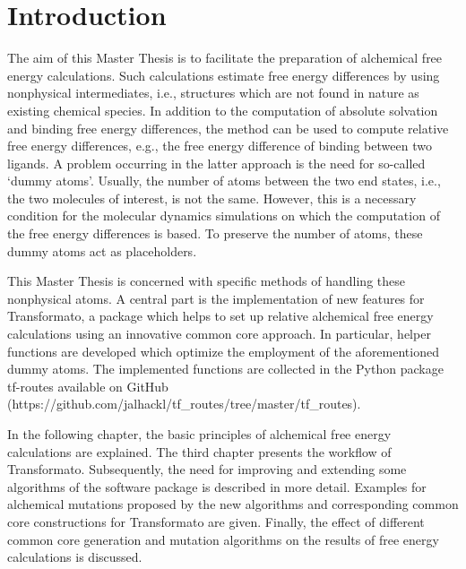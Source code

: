 \chapter{Introduction}

The aim of this Master Thesis is to facilitate the preparation of
alchemical free energy calculations. Such calculations
estimate free energy differences by using nonphysical intermediates, i.e., structures
which are not found in nature as existing chemical species. In addition
to the computation of absolute solvation and binding free energy differences,
the method can be used to compute relative free energy differences, e.g.,
the free energy difference of binding between two ligands. A problem occurring
in the latter approach is the need for so-called \textquoteleft dummy
atoms\textquoteright{}. Usually, the number of atoms between the two
end states, i.e., the two molecules of interest, is not the same.
However, this is a necessary condition for the molecular dynamics
simulations on which the computation of the free energy differences
is based. To preserve the number of atoms, these dummy atoms act as
placeholders\cite{Fleck.2021, Karwounopoulos.2022}.

This Master Thesis is concerned with specific methods of handling these nonphysical
atoms. A central part is the implementation of new features
for Transformato, a package which helps to set up relative alchemical
free energy calculations using an innovative common core approach\cite{key-2, Wieder.2022}.
In particular, helper functions are developed which optimize the employment of
the aforementioned dummy atoms. 
The implemented functions are collected in the  Python package tf-routes available on GitHub (https://github.com/jalhackl/tf\_routes/tree/master/tf\_routes).

In the following chapter, the basic principles of alchemical free energy
calculations are explained. The third chapter presents the workflow
of Transformato. Subsequently, the need for improving and extending some algorithms of the software
package is described in more detail. Examples for alchemical mutations
proposed by the new algorithms and corresponding common core constructions
for Transformato are given. Finally, the effect of different common core generation and mutation
algorithms on the results of free energy calculations is discussed.